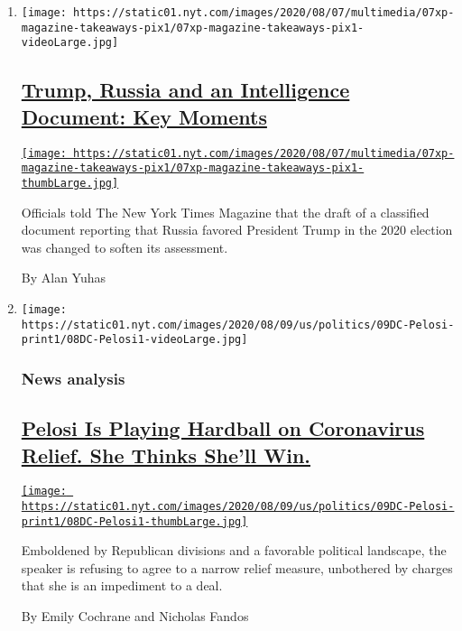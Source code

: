 \begin{enumerate}
\def\labelenumi{\arabic{enumi}.}
\item
  \texttt{[image: https://static01.nyt.com/images/2020/08/07/multimedia/07xp-magazine-takeaways-pix1/07xp-magazine-takeaways-pix1-videoLarge.jpg]}

  \hypertarget{trump-russia-and-an-intelligence-document-key-moments}{%
  \subsection{\texorpdfstring{\href{/2020/08/08/us/politics/trump-russia.html}{Trump,
  Russia and an Intelligence Document: Key
  Moments}}{Trump, Russia and an Intelligence Document: Key Moments}}\label{trump-russia-and-an-intelligence-document-key-moments}}

  \href{/2020/08/08/us/politics/trump-russia.html}{\texttt{[image: https://static01.nyt.com/images/2020/08/07/multimedia/07xp-magazine-takeaways-pix1/07xp-magazine-takeaways-pix1-thumbLarge.jpg]}}

  Officials told The New York Times Magazine that the draft of a
  classified document reporting that Russia favored President Trump in
  the 2020 election was changed to soften its assessment.

  By Alan Yuhas
\item
  \texttt{[image: https://static01.nyt.com/images/2020/08/09/us/politics/09DC-Pelosi-print1/08DC-Pelosi1-videoLarge.jpg]}

  \hypertarget{news-analysis}{%
  \subsubsection{News analysis}\label{news-analysis}}

  \hypertarget{pelosi-is-playing-hardball-on-coronavirus-relief-she-thinks-shell-win}{%
  \subsection{\texorpdfstring{\href{/2020/08/08/us/politics/nancy-pelosi-coronavirus-relief.html}{Pelosi
  Is Playing Hardball on Coronavirus Relief. She Thinks She'll
  Win.}}{Pelosi Is Playing Hardball on Coronavirus Relief. She Thinks She'll Win.}}\label{pelosi-is-playing-hardball-on-coronavirus-relief-she-thinks-shell-win}}

  \href{/2020/08/08/us/politics/nancy-pelosi-coronavirus-relief.html}{\texttt{[image: https://static01.nyt.com/images/2020/08/09/us/politics/09DC-Pelosi-print1/08DC-Pelosi1-thumbLarge.jpg]}}

  Emboldened by Republican divisions and a favorable political
  landscape, the speaker is refusing to agree to a narrow relief
  measure, unbothered by charges that she is an impediment to a deal.

  By Emily Cochrane and Nicholas Fandos
\end{enumerate}

